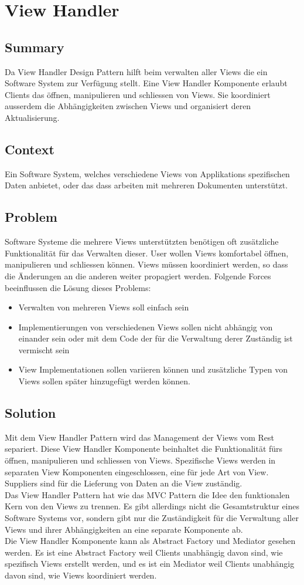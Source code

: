 \chapter{View Handler}
\section{Summary}
Da View Handler Design Pattern hilft beim verwalten aller Views die ein Software System zur Verfügung stellt. Eine View Handler Komponente erlaubt Clients das öffnen, manipulieren und schliessen von Views. Sie koordiniert ausserdem die Abhängigkeiten zwischen Views und organisiert deren Aktualisierung.
\section{Context}
Ein Software System, welches verschiedene Views von Applikations spezifischen Daten anbietet, oder das dass arbeiten mit mehreren Dokumenten unterstützt.
\section{Problem}
Software Systeme die mehrere Views unterstützten benötigen oft zusätzliche Funktionalität für das Verwalten dieser. User wollen Views komfortabel öffnen, manipulieren und schliessen können. Views müssen koordiniert werden, so dass die Änderungen an die anderen weiter propagiert werden. Folgende Forces beeinflussen die Lösung dieses Problems:
\begin{itemize}
	\item Verwalten von mehreren Views soll einfach sein
	\item Implementierungen von verschiedenen Views sollen nicht abhängig von einander sein oder mit dem Code der für die Verwaltung derer Zuständig ist vermischt sein
	\item View Implementationen sollen variieren können und zusätzliche Typen von Views sollen später hinzugefügt werden können.
\end{itemize}
\section{Solution}
Mit dem View Handler Pattern wird das Management der Views vom Rest separiert. Diese View Handler Komponente beinhaltet die Funktionalität fürs öffnen, manipulieren und schliessen von Views. Spezifische Views werden in separaten View Komponenten eingeschlossen, eine für jede Art von View. Suppliers sind für die Lieferung von Daten an die View zuständig. \\
Das View Handler Pattern hat wie das MVC Pattern die Idee den funktionalen Kern von den Views zu trennen. Es gibt allerdings nicht die Gesamtstruktur eines Software Systems vor, sondern gibt nur die Zuständigkeit für die Verwaltung aller Views und ihrer Abhängigkeiten an eine separate Komponente ab. \\
Die View Handler Komponente kann als Abstract Factory und Mediator gesehen werden. Es ist eine Abstract Factory weil Clients unabhängig davon sind, wie spezifisch Views erstellt werden, und es ist ein Mediator weil Clients unabhängig davon sind, wie Views koordiniert werden.
